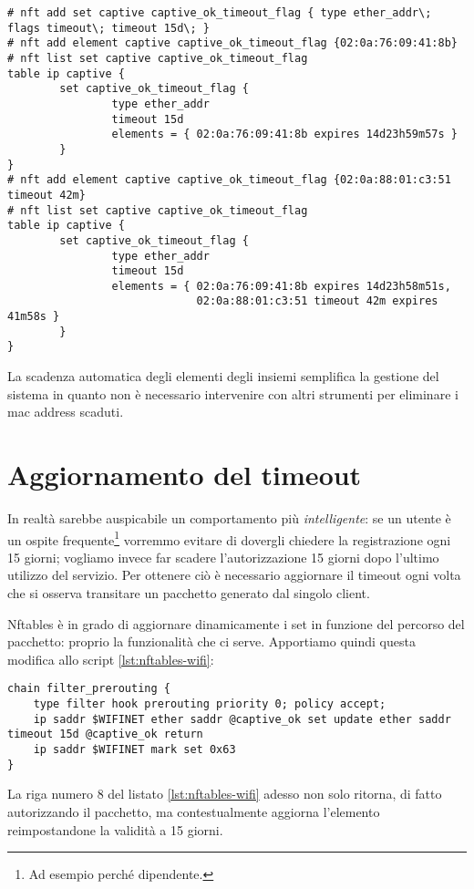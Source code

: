 \begin{lstlisting}
# nft add set captive captive_ok_timeout_flag { type ether_addr\; flags timeout\; timeout 15d\; }
# nft add element captive captive_ok_timeout_flag {02:0a:76:09:41:8b}
# nft list set captive captive_ok_timeout_flag
table ip captive {
        set captive_ok_timeout_flag {
                type ether_addr
                timeout 15d
                elements = { 02:0a:76:09:41:8b expires 14d23h59m57s }
        }
}
# nft add element captive captive_ok_timeout_flag {02:0a:88:01:c3:51 timeout 42m}
# nft list set captive captive_ok_timeout_flag
table ip captive {
        set captive_ok_timeout_flag {
                type ether_addr
                timeout 15d
                elements = { 02:0a:76:09:41:8b expires 14d23h58m51s,
                             02:0a:88:01:c3:51 timeout 42m expires 41m58s }
        }
}
\end{lstlisting}
La scadenza automatica degli elementi degli insiemi semplifica la gestione del sistema in quanto non è necessario intervenire con altri
strumenti per eliminare i mac address scaduti.

\section{Aggiornamento del timeout}
In realt\`a sarebbe auspicabile un comportamento pi\`u {\em intelligente}: se un utente \`e 
un ospite frequente\footnote{Ad esempio perch\'e dipendente.} vorremmo evitare
di dovergli chiedere la registrazione ogni 15 giorni;
vogliamo invece far scadere l'autorizzazione 15 giorni dopo l'ultimo utilizzo del servizio.
Per ottenere ci\`o \`e necessario aggiornare il timeout
ogni volta che si osserva transitare un pacchetto generato dal singolo client.

Nftables \`e in grado di aggiornare dinamicamente i set in funzione del
percorso del pacchetto: proprio la funzionalit\`a che ci serve.
Apportiamo quindi questa modifica allo script \ref{lst:nftables-wifi}:

\begin{lstlisting}[style=customc,firstnumber=6]
chain filter_prerouting {
    type filter hook prerouting priority 0; policy accept;
    ip saddr $WIFINET ether saddr @captive_ok set update ether saddr timeout 15d @captive_ok return
    ip saddr $WIFINET mark set 0x63
}
\end{lstlisting}
La riga numero 8 del listato \ref{lst:nftables-wifi} adesso non solo ritorna,
di fatto autorizzando il pacchetto, ma contestualmente aggiorna l'elemento
reimpostandone la validit\`a a 15 giorni.

